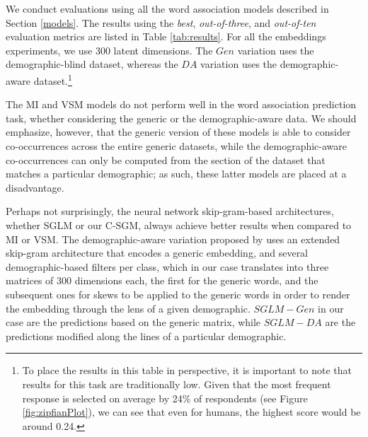 \documentclass[11pt,letterpaper]{article}
\begin{document}
We conduct evaluations using all the word association models described in Section \ref{models}. The results using the {\it best}, {\it out-of-three}, and {\it out-of-ten} evaluation metrics are listed in Table \ref{tab:results}. For all the embeddings experiments, we use 300 latent dimensions. The $Gen$ variation uses the demographic-blind dataset, whereas the $DA$ variation  uses the demographic-aware dataset.\footnote{To place the results in this table in perspective, it is important to note that results for this task are traditionally low. Given that the most frequent response is selected on average by 24\% of respondents (see Figure \ref{fig:zipfianPlot}), we can see that even for humans, the highest score would be around 0.24.}  

The MI and VSM models do not perform well in the word association prediction task, whether considering the generic or the demographic-aware data. We should emphasize, however, that the generic version of these models is able to consider co-occurrences across the entire generic datasets, while the demographic-aware co-occurrences can only be computed from the section of the dataset that matches a particular demographic; as such, these latter models are placed at a disadvantage. 

Perhaps not surprisingly, the neural network skip-gram-based architectures, whether SGLM or our C-SGM, always achieve better results when compared to MI or VSM. The demographic-aware variation proposed by \cite{Bamman2014} uses an extended skip-gram architecture that encodes a generic embedding, and several demographic-based filters per class, which in our case translates into three matrices of 300 dimensions each, the first for the generic words, and the subsequent ones for skews to be applied to the generic words in order to render the embedding through the lens of a given demographic. $SGLM-Gen$ in our case are the predictions based on the generic matrix, while $SGLM-DA$ are the predictions modified along the lines of a particular demographic. 
\end{document}
